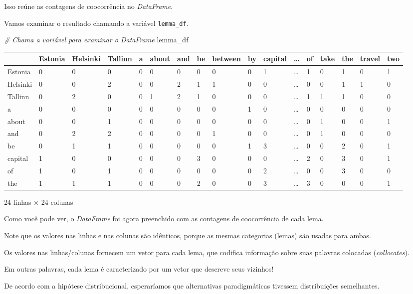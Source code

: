 \documentclass[
  brazilian,
]{article}
\newenvironment{Shaded}{}{}
\newcommand{\CommentTok}[1]{\textcolor[rgb]{0.38,0.63,0.69}{\textit{#1}}}
\newcommand{\NormalTok}[1]{#1}
\begin{document}
Isso reúne as contagens de coocorrência no \emph{DataFrame}.

Vamos examinar o resultado chamando a variável \texttt{lemma\_df}.

\begin{Shaded}
\begin{Highlighting}[]
\CommentTok{\# Chama a variável para examinar o DataFrame}
\NormalTok{lemma\_df}
\end{Highlighting}
\end{Shaded}

\begin{longtable}[]{@{}lllllllllllllllll@{}}
\toprule
& Estonia & Helsinki & Tallinn & a & about & and & be & between & by &
capital & \ldots{} & of & take & the & travel & two\tabularnewline
\midrule
\endhead
Estonia & 0 & 0 & 0 & 0 & 0 & 0 & 0 & 0 & 0 & 1 & \ldots{} & 1 & 0 & 1 &
0 & 1\tabularnewline
Helsinki & 0 & 0 & 2 & 0 & 0 & 2 & 1 & 1 & 0 & 0 & \ldots{} & 0 & 0 & 1
& 1 & 0\tabularnewline
Tallinn & 0 & 2 & 0 & 0 & 1 & 2 & 1 & 0 & 0 & 0 & \ldots{} & 1 & 1 & 1 &
0 & 0\tabularnewline
a & 0 & 0 & 0 & 0 & 0 & 0 & 0 & 0 & 1 & 0 & \ldots{} & 0 & 0 & 0 & 0 &
0\tabularnewline
about & 0 & 0 & 1 & 0 & 0 & 0 & 0 & 0 & 0 & 0 & \ldots{} & 0 & 1 & 0 & 0
& 1\tabularnewline
and & 0 & 2 & 2 & 0 & 0 & 0 & 0 & 1 & 0 & 0 & \ldots{} & 0 & 1 & 0 & 0 &
0\tabularnewline
be & 0 & 1 & 1 & 0 & 0 & 0 & 0 & 0 & 1 & 3 & \ldots{} & 0 & 0 & 2 & 0 &
1\tabularnewline
capital & 1 & 0 & 0 & 0 & 0 & 0 & 3 & 0 & 0 & 0 & \ldots{} & 2 & 0 & 3 &
0 & 1\tabularnewline
of & 1 & 0 & 1 & 0 & 0 & 0 & 0 & 0 & 0 & 2 & \ldots{} & 0 & 0 & 3 & 0 &
0\tabularnewline
the & 1 & 1 & 1 & 0 & 0 & 0 & 2 & 0 & 0 & 3 & \ldots{} & 3 & 0 & 0 & 0 &
1\tabularnewline
\bottomrule
\end{longtable}

24 linhas × 24 colunas

Como você pode ver, o \emph{DataFrame} foi agora preenchido com as
contagens de coocorrência de cada lema.

Note que os valores nas linhas e nas colunas são idênticos, porque as
mesmas categorias (lemas) são usadas para ambas.

Os valores nas linhas/colunas fornecem um vetor para cada lema, que
codifica informação sobre suas palavras colocadas (\emph{collocates}).

Em outras palavras, cada lema é caracterizado por um vetor que descreve
seus vizinhos!

De acordo com a hipótese distribucional, esperaríamos que alternativas
paradigmáticas tivessem distribuições semelhantes.
\end{document}
